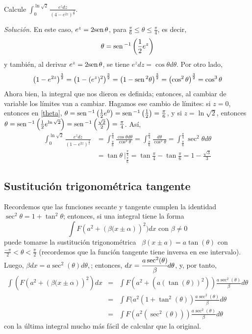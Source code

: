 \begin{ejemplo}
Calcule $\displaystyle{\int_{0}^{\ln \sqrt{2}}\frac{e^{z}dz}{\left( 4-e^{2z}\right) ^{\frac{3}{2}}}}$.
\end{ejemplo}
\textit{Solución.} En este caso, $e^{z}=2\text{\rm sen}\,\theta$, para $\frac{\pi }{6}\leq \theta \leq \frac{\pi }{4}$, es decir,
\begin{equation}\label{theta}
\theta=\text{\rm sen}\,^{-1}\left(\frac{1}{2}e^{z}\right)
\end{equation}
y también, al derivar $e^z=2\text{\rm sen}\,\theta$, se tiene $e^{z}dz=\cos \theta d\theta$. Por otro lado,
\[
\left( 1-e^{2z}\right)^{\frac{3}{2}}=\left( 1-(e^{z})^2\right)^{\frac{3}{2}}=\left( 1-\text{\rm sen}\,^{2}\theta \right) ^{\frac{3}{2}}=\left( \cos^{2}\theta \right) ^{\frac{3}{2}}=\cos ^{3}\theta \]
Ahora bien, la integral que nos dieron es definida; entonces, al cambiar de variable los límites van a cambiar. Hagamos ese cambio de límites: si $z=0$, entonces en \eqref{theta}, $\theta =\text{\rm sen}\,^{-1} \left( \frac{1}{2}e^0\right)=\text{\rm sen}\,^{-1} \left( \frac{1}{2}\right)=\frac{\pi }{6}$, y si $z=\ln \sqrt{2}$, entonces {\small $\theta=\text{\rm sen}\,^{-1} \left(\frac{1}{2}e^{\ln\sqrt{2}}\right) =\text{\rm sen}\,^{-1} \left(\frac{\sqrt{2}}{2}\right) =\frac{\pi }{4}$.} Así,
{\small
\begin{align*}
\int_{0}^{\ln \sqrt{2}}\frac{e^{z}dz}{\left( 1-e^{2z}\right) ^{\frac{3}{2}}}&=\int_{\frac{\pi }{6}}^{\frac{\pi }{4}}\frac{\cos \theta d\theta }{\cos^{3}\theta }=\int_{\frac{\pi }{6}}^{\frac{\pi }{4}}\frac{d\theta }{\cos^{2}\theta } =\int_{\frac{\pi }{6}}^{\frac{\pi }{4}}\sec ^{2}\theta d\theta
\\
&= \tan \theta\ \Big|_{\frac{\pi }{6}}^{\frac{\pi }{4}}=\tan \frac{\pi }{4}-\tan \frac{\pi }{6}=1-\frac{\sqrt{3}}{3}
\end{align*}
}

\subsection*{Sustitución trigonométrica tangente}

Recordemos que las funciones secante y tangente cumplen la identidad $\sec^2\theta=1+\tan^2\theta$; entonces, si una integral tiene la forma
\[
\int F(a^{2}+\left( \beta (x\pm \alpha \right) )^{2})dx\text{ con } \beta \neq 0
\]
puede tomarse la sustitución trigonométrica \ $\beta (x\pm a)=a\tan
(\theta )$ con $\frac{-\pi }{2}<\theta <\frac{\pi }{2}$ (recordemos que la
función tangente tiene inversa en ese intervalo). Luego, $\beta dx=a\sec ^{2}(\theta)d\theta,$; entonces, $dx=\cfrac{a\sec ^{2}(\theta )}{\beta}d\theta $, y, por tanto,
\begin{eqnarray*}
\int (F(a^{2}+\left( \beta (x\pm \alpha \right) )^{2})dx &=&\int
F(a^{2}+(a(\tan (\theta ))^{2}))\frac{a\sec ^{2}(\theta )}{\beta }d\theta \\
&=&\int F(a^{2}(1+\tan ^{2}(\theta ))\frac{a\sec ^{2}(\theta )}{\beta }%
d\theta \\
&=&\int F(a^{2}(\sec ^{2}(\theta )))\frac{a\sec ^{2}(\theta )}{\beta }%
d\theta
\end{eqnarray*}
con la última integral mucho más fácil de calcular que la original.


